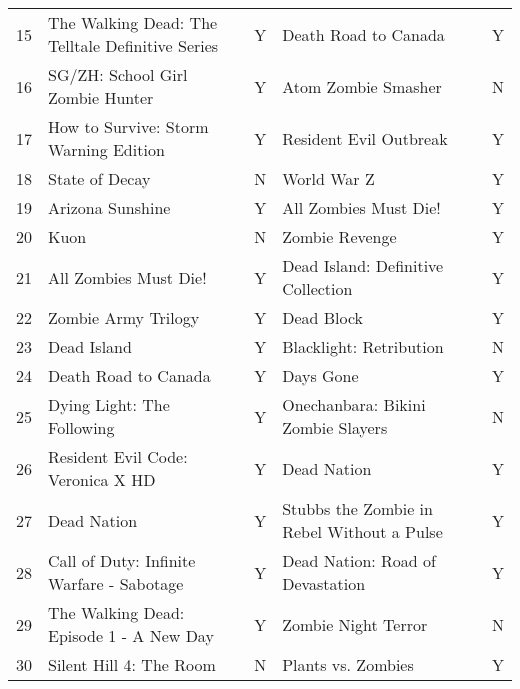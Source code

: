 \begin{tabular}{rllll}
   15 & The Walking Dead: The Telltale Definitive Series &         Y &                       Death Road to Canada &         Y \\
   16 &                 SG/ZH: School Girl Zombie Hunter &         Y &                        Atom Zombie Smasher &         N \\
   17 &            How to Survive: Storm Warning Edition &         Y &                     Resident Evil Outbreak &         Y \\
   18 &                                   State of Decay &         N &                                World War Z &         Y \\
   19 &                                 Arizona Sunshine &         Y &                      All Zombies Must Die! &         Y \\
   20 &                                             Kuon &         N &                             Zombie Revenge &         Y \\
   21 &                            All Zombies Must Die! &         Y &         Dead Island: Definitive Collection &         Y \\
   22 &                              Zombie Army Trilogy &         Y &                                 Dead Block &         Y \\
   23 &                                      Dead Island &         Y &                    Blacklight: Retribution &         N \\
   24 &                             Death Road to Canada &         Y &                                  Days Gone &         Y \\
   25 &                       Dying Light: The Following &         Y &         Onechanbara: Bikini Zombie Slayers &         N \\
   26 &                Resident Evil Code: Veronica X HD &         Y &                                Dead Nation &         Y \\
   27 &                                      Dead Nation &         Y & Stubbs the Zombie in Rebel Without a Pulse &         Y \\
   28 &        Call of Duty: Infinite Warfare - Sabotage &         Y &           Dead Nation: Road of Devastation &         Y \\
   29 &          The Walking Dead: Episode 1 - A New Day &         Y &                        Zombie Night Terror &         N \\
   30 &                          Silent Hill 4: The Room &         N &                         Plants vs. Zombies &         Y \\
\bottomrule
\end{tabular}
